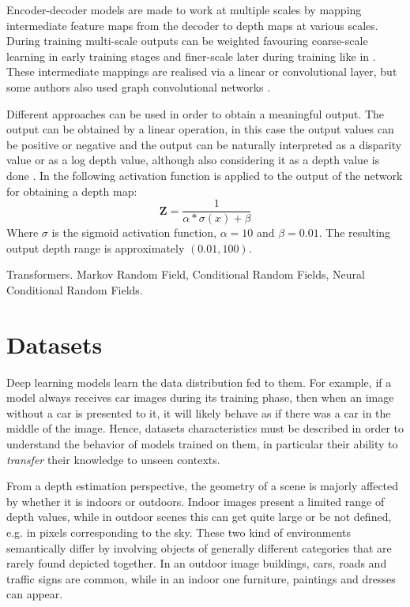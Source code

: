 Encoder-decoder models are made to work at multiple scales by mapping intermediate feature maps from the decoder to depth maps at various scales.
During training multi-scale outputs can be weighted favouring coarse-scale learning in early training stages and finer-scale later during training like in \cite{DispNet}.
These intermediate mappings are realised via a linear or convolutional layer, but some authors also used graph convolutional networks \cite{GCNDepth}.


Different approaches can be used in order to obtain a meaningful output.
The output can be obtained by a linear operation, in this case the output values can be positive or negative and the output can be naturally interpreted as a disparity value or as a log depth value, although also considering it as a depth value is done \cite{Eigen}.
In \cite{SfMLearner} the following activation function is applied to the output of the network for obtaining a depth map:
\[
	\mathbf{Z} = \frac{1}{\alpha * \sigma(x) + \beta}
\]
Where $\sigma$ is the sigmoid activation function, $\alpha=10$ and $\beta=0.01$.
The resulting output depth range is approximately $(0.01, 100)$.

Transformers.
Markov Random Field, Conditional Random Fields, Neural Conditional Random Fields.

\section{Datasets}
Deep learning models learn the data distribution fed to them.
For example, if a model always receives car images during its training phase, then when an image without a car is presented to it, it will likely behave as if there was a car in the middle of the image.
Hence, datasets characteristics must be described in order to understand the behavior of models trained on them, in particular their ability to \textit{transfer} their knowledge to unseen contexts.

From a depth estimation perspective, the geometry of a scene is majorly affected by whether it is indoors or outdoors.
Indoor images present a limited range of depth values, while in outdoor scenes this can get quite large or be not defined, e.g. in pixels corresponding to the sky.
These two kind of environments semantically differ by involving objects of generally different categories that are rarely found depicted together.
In an outdoor image buildings, cars, roads and traffic signs are common, while in an indoor one furniture, paintings and dresses can appear.

